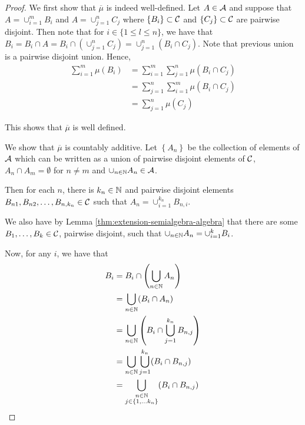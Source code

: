 \begin{proof}
    We first show that $\overline \mu$ is indeed well-defined. Let $A\in {\cal A}$ and suppose that $A= \cup_{i=1}^{m} B_i$ and $A=\cup_{j=1}^{n} C_j$ where  $\left\{ B_i \right\} \subset {\cal C}$ and $\left\{ C_j \right\} \subset {\cal C}$ are pairwise disjoint. Then note that for $i \in \{1\le l \le n\}$, we have that $B_i = B_i \cap A = B_i \cap \left(\cup_{j=1}^{n} C_j\right) = \cup_{j=1}^{n} (B_i \cap C_j)$. Note that previous union is a pairwise disjoint union. Hence,
    \begin{align*}
	\sum_{i=1}^{m} \mu (B_i ) &= \sum_{i=1}^{m} \sum_{j=1}^{n} \mu(B_i \cap C_j) \\
	&= \sum_{j=1}^{n} \sum_{i=1}^{m} \mu(B_i \cap C_j) \\
	&= \sum_{j=1}^{n} \mu (C_j)
    \end{align*}

    This shows that $\overline \mu$ is well defined.

    We show that $\overline \mu $ is countably additive. Let $\left\{ A_n \right\}$ be the collection of elements of ${\cal A}$ which can be written as a union of pairwise disjoint elements of ${\cal C}$, $A_n \cap A_m = \emptyset$ for $n\ne m$ and $\cup_{n\in \mathbb N} A_n \in {\cal A}$.

    Then for each $n$, there is $k_n \in \mathbb N$ and pairwise disjoint elements $B_{n1} , B_{n2} , \ldots , B_{n,k_n} \in {\cal C}$ such that $A_n = \cup_{i=1}^{k_n} B_{n,i}$.

    We also have by Lemma \ref{thm:extension-semialgebra-algebra} that there are some $B_1 , \ldots , B_k \in{\cal C}$, pairwise disjoint, such that $\cup_{n\in \mathbb N} A_n = \cup_{i=1}^{k} B_i$. 

    Now, for any $i$, we have that 
    \begin{align*}
	B_i &= B_i \cap \left( \bigcup_{n\in\mathbb N} A_n \right) \\
	&= \bigcup_{n\in \mathbb N} (B_i \cap A_n) \\
	&= \bigcup_{n\in \mathbb N} \left( B_i \cap \bigcup_{j=1}^{k_n} B_{n,j} \right) \\
	&= \bigcup_{n\in \mathbb N} \bigcup_{j=1}^{k_n} (B_i \cap B_{n,j}) \\
	&= \bigcup_{\substack{n\in \mathbb N \\ j\in \left\{ 1, \ldots k_n \right\}}} (B_i \cap B_{n,j}) 
    \end{align*}


\end{proof}
